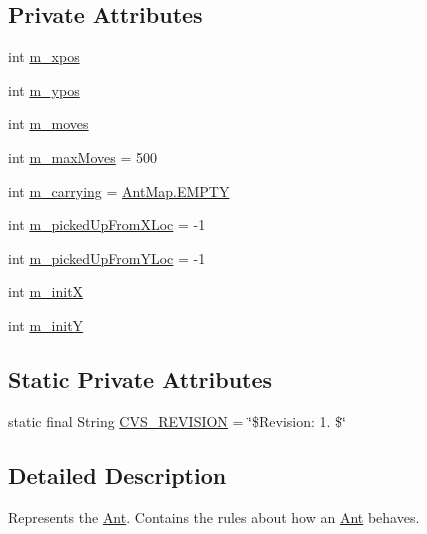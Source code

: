 \subsection*{Private Attributes}
\begin{DoxyCompactItemize}
\item 
int \hyperlink{classexamples_1_1gp_1_1painted_desert_1_1_ant_a84346d8657288f8b63c1d45e1490445c}{m\-\_\-xpos}
\item 
int \hyperlink{classexamples_1_1gp_1_1painted_desert_1_1_ant_a2f61949bf3f5ddb83f6b753aeed37da8}{m\-\_\-ypos}
\item 
int \hyperlink{classexamples_1_1gp_1_1painted_desert_1_1_ant_a7483963fda857bdc4178d409d8660f76}{m\-\_\-moves}
\item 
int \hyperlink{classexamples_1_1gp_1_1painted_desert_1_1_ant_a1db29299cd14dcfea37f4b09a123dcb9}{m\-\_\-max\-Moves} = 500
\item 
int \hyperlink{classexamples_1_1gp_1_1painted_desert_1_1_ant_aeff0963729db42464f91adbb003a7454}{m\-\_\-carrying} = \hyperlink{classexamples_1_1gp_1_1painted_desert_1_1_ant_map_a615af6a550b5cc40655f383d6f7ee97e}{Ant\-Map.\-E\-M\-P\-T\-Y}
\item 
int \hyperlink{classexamples_1_1gp_1_1painted_desert_1_1_ant_a4c60bbb0297bd97686394a017e68959d}{m\-\_\-picked\-Up\-From\-X\-Loc} = -\/1
\item 
int \hyperlink{classexamples_1_1gp_1_1painted_desert_1_1_ant_acb8a8d8bb3490def0171bdc5f09c0090}{m\-\_\-picked\-Up\-From\-Y\-Loc} = -\/1
\item 
int \hyperlink{classexamples_1_1gp_1_1painted_desert_1_1_ant_a51306678c174f4302bfc7465f02c6f1e}{m\-\_\-init\-X}
\item 
int \hyperlink{classexamples_1_1gp_1_1painted_desert_1_1_ant_a0745688b88023853cc28d8145ee7dde6}{m\-\_\-init\-Y}
\end{DoxyCompactItemize}
\subsection*{Static Private Attributes}
\begin{DoxyCompactItemize}
\item 
static final String \hyperlink{classexamples_1_1gp_1_1painted_desert_1_1_ant_a7d597823cf1b07d70454c15ded3f094a}{C\-V\-S\-\_\-\-R\-E\-V\-I\-S\-I\-O\-N} = \char`\"{}\$Revision\-: 1. \$\char`\"{}
\end{DoxyCompactItemize}


\subsection{Detailed Description}
Represents the \hyperlink{classexamples_1_1gp_1_1painted_desert_1_1_ant}{Ant}. Contains the rules about how an \hyperlink{classexamples_1_1gp_1_1painted_desert_1_1_ant}{Ant} behaves.

